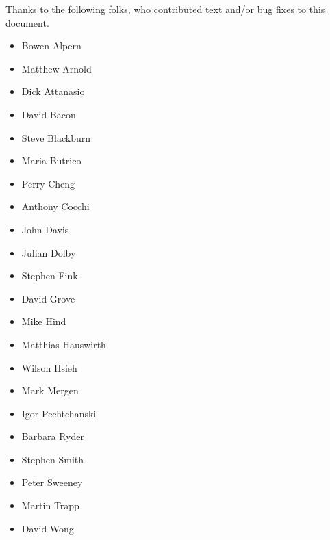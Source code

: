 Thanks to the following folks, who contributed text and/or bug fixes to
this document.

\begin{itemize}
\item Bowen Alpern
\item Matthew Arnold
\item Dick Attanasio
\item David Bacon
\item Steve Blackburn
\item Maria Butrico
\item Perry Cheng
\item Anthony Cocchi
\item John Davis
\item Julian Dolby
\item Stephen Fink
\item David Grove
\item Mike Hind
\item Matthias Hauswirth
\item Wilson Hsieh
\item Mark Mergen
\item Igor Pechtchanski
\item Barbara Ryder
\item Stephen Smith
\item Peter Sweeney
\item Martin Trapp
\item David Wong
\end{itemize}
